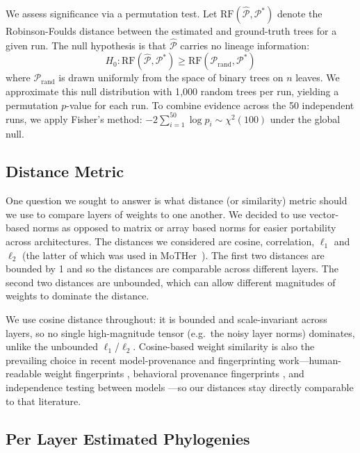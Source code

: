 \documentclass{article}
\theoremstyle{definition}
\theoremstyle{plain}
\begin{document}
We assess significance via a permutation test. Let $\mathrm{RF}(\widehat{\mathcal{P}},
\mathcal{P}^*)$ denote the Robinson-Foulds distance between the estimated and
ground-truth trees for a given run. The null hypothesis is that $\widehat{\mathcal{P}}$
carries no lineage information:
$$
H_0: \mathrm{RF}(\widehat{\mathcal{P}}, \mathcal{P}^*) \ge
     \mathrm{RF}(\mathcal{P}_{\text{rand}}, \mathcal{P}^*)
$$
where $\mathcal{P}_{\text{rand}}$ is drawn uniformly from the space of binary trees
on $n$ leaves. We approximate this null distribution with 1{,}000 random trees per
run, yielding a permutation $p$-value for each run. To combine evidence across the
50 independent runs, we apply Fisher's method: $-2\sum_{i=1}^{50} \log p_i \sim
\chi^2(100)$ under the global null.



\subsection{Distance Metric}
\label{sec:framework:metric}

One question we sought to answer is what distance (or similarity) metric should we use to compare layers of weights to one another.  We decided to use vector-based norms as opposed to matrix or array based norms for easier portability across architectures.  The distances we considered are  cosine, correlation, $\ell_1$ and $\ell_2$ (the latter of which was used in MoTHer~\citep{horwitz2024mother}).  The first two distances are bounded by 1 and so the distances are comparable across different layers.  The second two distances are unbounded, which can allow different magnitudes of weights to dominate the distance.

We use cosine distance throughout: it is bounded and scale-invariant across layers, so no single
high-magnitude tensor (e.g.\ the noisy layer norms) dominates, unlike the unbounded $\ell_1$/$\ell_2$.
Cosine-based weight similarity is also the prevailing choice in recent model-provenance and
fingerprinting work---human-readable weight fingerprints \citep{zeng2024huref}, behavioral provenance
fingerprints \citep{behavioral2026provenance}, and independence testing between models
\citep{zhu2025independence}---so our distances stay directly comparable to that literature.





\subsection{Per Layer Estimated Phylogenies}
\label{sec:framework:layers}
\end{document}

